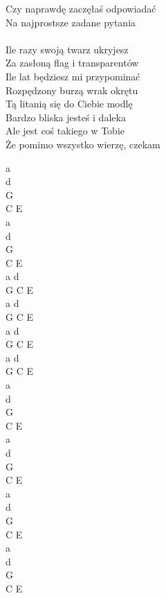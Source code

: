 \documentclass[a5paper, 10pt]{book}
\begin{document}
\begin{minipage}[t]{0.8\textwidth}
  Czy naprawdę zaczęłaś odpowiadać\\
  Na najprostsze zadane pytania\\
  \\
  Ile razy swoją twarz ukryjesz\\
  Za zasłoną flag i transparentów\\
  Ile lat będziesz mi przypominać\\
  Rozpędzony burzą wrak okrętu\\
  Tą litanią się do Ciebie modlę\\
  Bardzo bliska jesteś i daleka\\
  Ale jest coś takiego w Tobie\\
  Że pomimo wszystko wierzę, czekam\\
\end{minipage}
\begin{minipage}[t]{0.2\textwidth}
  a\\
  d\\
  G\\
  C E\\
  a\\
  d\\
  G\\
  C E\\

  a d\\
  G C E\\
  a d\\
  G C E\\
  a d\\
  G C E\\
  a d\\
  G C E\\

  a\\
  d\\
  G\\
  C E\\
  a\\
  d\\
  G\\
  C E\\

  a\\
  d\\
  G\\
  C E\\
  a\\
  d\\
  G\\
  C E\\
\end{minipage}
\end{document}
